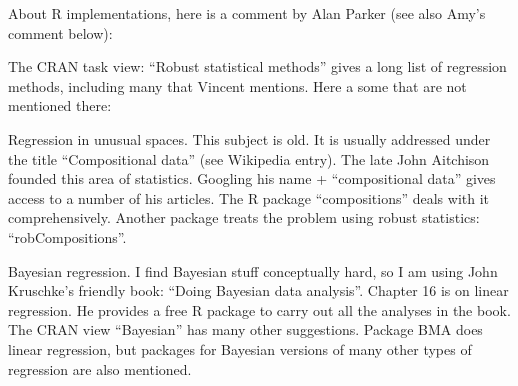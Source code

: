 \newpage
About R implementations, here is a comment by Alan Parker (see also Amy's comment below):

The CRAN task view: “Robust statistical methods” gives a long list of regression methods, including many that Vincent mentions. Here a some that are not mentioned there: 

Regression in unusual spaces. This subject is old. It is usually addressed under the title “Compositional data” (see Wikipedia entry). The late John Aitchison founded this area of statistics. Googling his name + “compositional data” gives access to a number of his articles. The R package “compositions” deals with it comprehensively. Another package treats the problem using robust statistics: “robCompositions”. 

Bayesian regression. I find Bayesian stuff conceptually hard, so I am using John Kruschke’s friendly book: “Doing Bayesian data analysis”. Chapter 16 is on linear regression. He provides a free R package to carry out all the analyses in the book. The CRAN view “Bayesian” has many other suggestions. Package BMA does linear regression, but packages for Bayesian versions of many other types of regression are also mentioned. 



